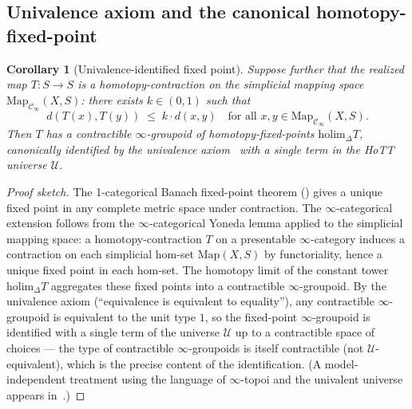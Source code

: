 \documentclass[11pt,a4paper]{article}
\theoremstyle{plain}
\newtheorem{corollary}[theorem]{Corollary}
\theoremstyle{definition}
\theoremstyle{remark}
\begin{document}
\subsection{Univalence axiom and the canonical homotopy-fixed-point}

\begin{corollary}[Univalence-identified fixed point]
\label{cor:hott-fixedpoint}
Suppose further that the realized map $T : S \to S$ is a
homotopy-contraction on the simplicial mapping space
$\mathrm{Map}_{\mathcal{C}_\infty}(X, S)$: there exists $k \in (0,1)$
such that
\[
d(T(x), T(y)) \;\leq\; k \cdot d(x, y)
\quad \text{for all } x, y \in \mathrm{Map}_{\mathcal{C}_\infty}(X, S).
\]
Then $T$ has a contractible $\infty$-groupoid of homotopy-fixed-points
$\mathrm{holim}_\Delta T$, canonically identified by the univalence
axiom~\cite[\S 2.9--2.10]{hottbook2013} with a single term in the
HoTT universe $\mathcal{U}$.
\end{corollary}

\begin{proof}[Proof sketch]
The 1-categorical Banach fixed-point theorem (\cite{banach1922}) gives
a unique fixed point in any complete metric space under contraction.
The $\infty$-categorical extension follows from the $\infty$-categorical
Yoneda lemma applied to the simplicial mapping space: a
homotopy-contraction $T$ on a presentable $\infty$-category induces a
contraction on each simplicial hom-set $\mathrm{Map}(X, S)$ by functoriality,
hence a unique fixed point in each hom-set. The homotopy limit of the
constant tower $\mathrm{holim}_\Delta T$ aggregates these fixed points
into a contractible $\infty$-groupoid. By the univalence axiom
(``equivalence is equivalent to equality''), any contractible
$\infty$-groupoid is equivalent to the unit type $1$, so the
fixed-point $\infty$-groupoid is identified with a single term of
the universe $\mathcal{U}$ up to a contractible space of choices ---
the type of contractible $\infty$-groupoids is itself contractible
(not $\mathcal{U}$-equivalent), which is the precise content of the
identification. (A model-independent treatment
using the language of $\infty$-topoi and the univalent universe appears
in~\cite{cisinski2019}.)
\end{proof}
\end{document}
